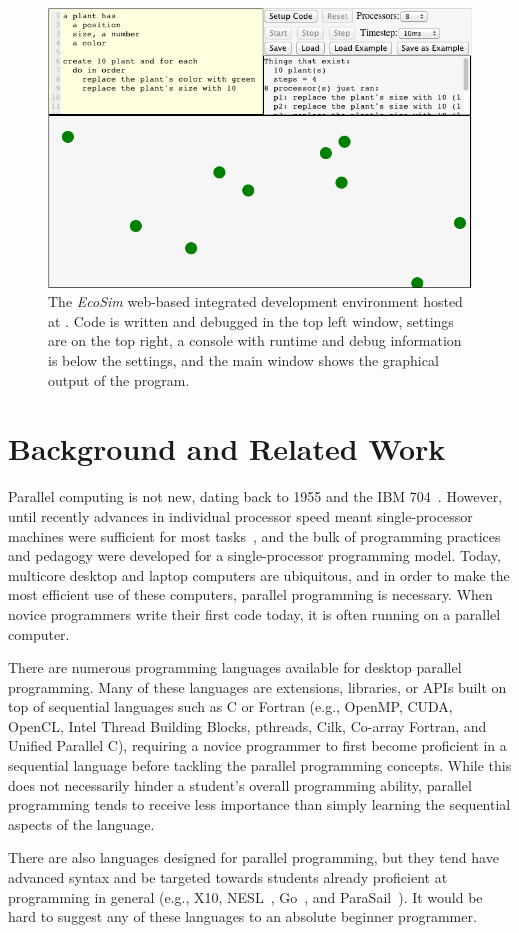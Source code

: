 \documentclass{sig-alternate}
\begin{document}
\begin{figure}
\centerline{\includegraphics[width=.49\textwidth]{figures/EcosimScreencap2.png}}
\caption{The \emph{EcoSim} web-based integrated development environment hosted at
\ecosimPath{}.  Code is written and debugged in the top left window, settings are on
the top right, a console with runtime and debug information is below the settings, and the
main window shows the graphical output of the program.}
\label{fig:ecosimScreencap}
\end{figure}


\section{Background and Related Work}
Parallel computing is not new, dating back to 1955 and the IBM 704~\cite{hockney1988parallel}.
However, until recently advances in individual processor speed meant single-processor machines
were sufficient for most tasks~\cite{amdahl1967validity}, 
and the bulk of programming practices and pedagogy were developed for a single-processor programming model.
Today, multicore desktop and laptop computers are ubiquitous, and in order to make the most
efficient use of these computers, parallel programming is necessary.  
When novice programmers write their first code today, it is often running on a parallel computer.

There are numerous programming languages available for desktop parallel programming.  Many of
these languages are extensions, libraries, or APIs built on top of sequential languages such 
as C or Fortran 
(e.g., OpenMP, CUDA, OpenCL, Intel Thread Building Blocks, pthreads, Cilk, Co-array Fortran, and Unified Parallel C),
requiring a novice programmer to first become proficient in a sequential language 
before tackling the parallel programming concepts.  
While this does not necessarily hinder a student's overall programming ability, 
parallel programming tends to receive less importance 
than simply learning the sequential aspects of the language.  

There are also languages designed for parallel programming, but they tend have advanced
syntax and be targeted towards
students already proficient at programming in general (e.g., X10\cite{X10}, 
NESL~\cite{nesl-impl-94}, Go~\cite{GoLanguage}, and ParaSail~\cite{ParaSail}).  It would be hard to suggest any of these
languages to an absolute beginner programmer.
\end{document}
